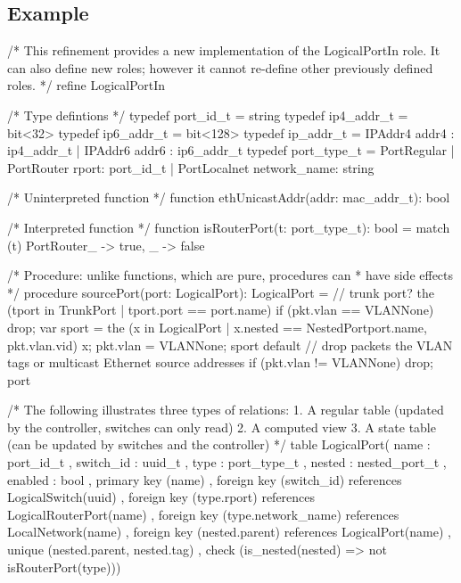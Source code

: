 \documentclass{report}
\begin{document}
\subsection*{Example}

\begin{ccnlisting}{}
/* This refinement provides a new implementation of the LogicalPortIn role.
   It can also define new roles; however it cannot re-define other 
   previously defined roles. */
refine LogicalPortIn { 
    /* Type defintions */
    typedef port_id_t  = string
    typedef ip4_addr_t = bit<32>
    typedef ip6_addr_t = bit<128>
    typedef ip_addr_t  = IPAddr4 {addr4 : ip4_addr_t}
                       | IPAddr6 {addr6 : ip6_addr_t}
    typedef port_type_t = PortRegular  
                        | PortRouter   { rport: port_id_t}
                        | PortLocalnet { network_name: string}

    /* Uninterpreted function */
    function ethUnicastAddr(addr: mac_addr_t): bool
    
    /* Interpreted function */
    function isRouterPort(t: port_type_t): bool = 
        match (t) {
            PortRouter{_} -> true,
            _             -> false
        }

    /* Procedure: unlike functions, which are pure, procedures can
     * have side effects */
    procedure sourcePort(port: LogicalPort): LogicalPort =
        // trunk port?
        the (tport in TrunkPort | tport.port == port.name) {
            if (pkt.vlan == VLANNone) drop;
            var sport = the (x in LogicalPort 
                             | x.nested == NestedPort{port.name, pkt.vlan.vid}) x;
            pkt.vlan = VLANNone;
            sport
        } default {
            // drop packets the VLAN tags or multicast Ethernet source addresses
            if (pkt.vlan != VLANNone) drop;
            port
        }

    /* The following illustrates three types of relations:
       1. A regular table (updated by the controller, switches can only read)
       2. A computed view
       3. A state table (can be updated by switches and the controller) */
    table LogicalPort( 
           name      : port_id_t
         , switch_id : uuid_t
         , type      : port_type_t
         , nested    : nested_port_t
         , enabled   : bool
         , primary key (name)
         , foreign key (switch_id)         references LogicalSwitch(uuid)
         , foreign key (type.rport)        references LogicalRouterPort(name)
         , foreign key (type.network_name) references LocalNetwork(name)
         , foreign key (nested.parent)     references LogicalPort(name)
         , unique (nested.parent, nested.tag)
         , check (is_nested(nested) => not isRouterPort(type)))

}
\end{ccnlisting}
\end{document}
